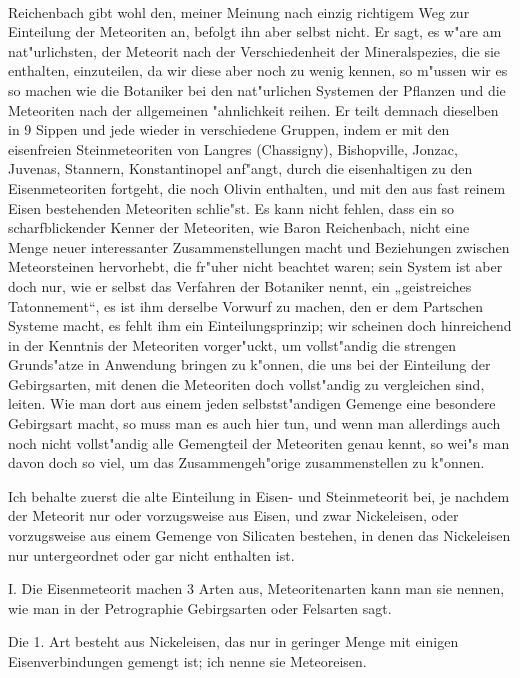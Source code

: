 \documentclass[a4paper, 11pt, oneside]{article}
\begin{document}
\paragraph{}
Reichenbach gibt wohl den, meiner Meinung nach einzig richtigem Weg zur Einteilung der Meteoriten an, befolgt ihn aber selbst nicht. Er sagt, es w"are am nat"urlichsten, der Meteorit nach der Verschiedenheit der Mineralspezies, die sie enthalten, einzuteilen, da wir diese aber noch zu wenig kennen, so m"ussen wir es so machen wie die Botaniker bei den nat"urlichen Systemen der Pflanzen und die Meteoriten nach der allgemeinen "ahnlichkeit reihen. Er teilt demnach dieselben in 9 Sippen und jede wieder in verschiedene Gruppen, indem er mit den eisenfreien Steinmeteoriten von Langres (Chassigny), Bishopville, Jonzac, Juvenas, Stannern, Konstantinopel anf"angt, durch die eisenhaltigen zu den Eisenmeteoriten fortgeht, die noch Olivin enthalten, und mit den aus fast reinem Eisen bestehenden Meteoriten schlie"st. Es kann nicht fehlen, dass ein so scharfblickender Kenner der Meteoriten, wie Baron Reichenbach, nicht eine Menge neuer interessanter Zusammenstellungen macht und Beziehungen zwischen Meteorsteinen hervorhebt, die fr"uher nicht beachtet waren; sein System ist aber doch nur, wie er selbst das Verfahren der Botaniker nennt, ein „geistreiches Tatonnement“, es ist ihm derselbe Vorwurf zu machen, den er dem Partschen Systeme macht, es fehlt ihm ein Einteilungsprinzip; wir scheinen doch hinreichend in der Kenntnis der Meteoriten vorger"uckt, um vollst"andig die strengen Grunds"atze in Anwendung bringen zu k"onnen, die uns bei der Einteilung der Gebirgsarten, mit denen die Meteoriten doch vollst"andig zu vergleichen sind, leiten. Wie man dort aus einem jeden selbstst"andigen Gemenge eine besondere Gebirgsart macht, so muss man es auch hier tun, und wenn man allerdings auch noch nicht vollst"andig alle Gemengteil der Meteoriten genau kennt, so wei"s man davon doch so viel, um das Zusammengeh"orige zusammenstellen zu k"onnen.

Ich behalte zuerst die alte Einteilung in Eisen- und Steinmeteorit bei, je nachdem der Meteorit nur oder vorzugsweise aus Eisen, und zwar Nickeleisen, oder vorzugsweise aus einem Gemenge von Silicaten bestehen, in denen das Nickeleisen nur untergeordnet oder gar nicht enthalten ist.

I. Die Eisenmeteorit machen 3 Arten aus, Meteoritenarten kann man sie nennen, wie man in der Petrographie Gebirgsarten oder Felsarten sagt.

Die 1. Art besteht aus Nickeleisen, das nur in geringer Menge mit einigen Eisenverbindungen gemengt ist; ich nenne sie Meteoreisen.
\end{document}
